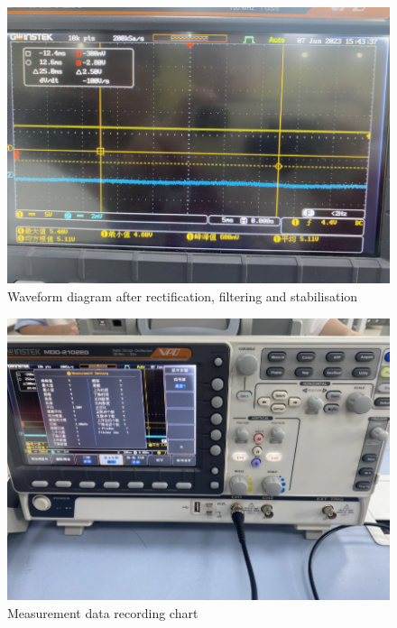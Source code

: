 \documentclass[UTF8]{article}
\begin{document}
\begin{appendix}
    	\begin{figure}[H]
    	    	\centering
    	    	\includegraphics[clip,scale=0.8,trim={0 0 0 0}]{fig/fig17.png}
    	        \caption{Waveform diagram after rectification, filtering and stabilisation}
    	        \label{figure.17}
        \end{figure}  
        
    	\begin{figure}[H]
    	    	\centering
    	    	\includegraphics[clip,scale=0.8,trim={0 0 0 0}]{fig/fig18.png}
    	        \caption{Measurement data recording chart}
    	        \label{figure.18}
        \end{figure} 
        

\end{appendix}
\end{document}
